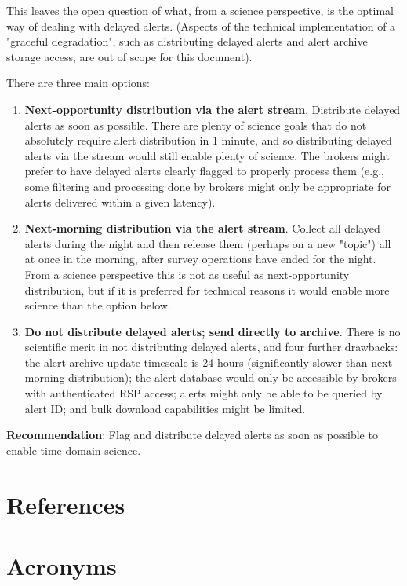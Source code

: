 \documentclass[DM,authoryear,toc]{lsstdoc}
\begin{document}
This leaves the open question of what, from a science perspective, is the optimal way of dealing with delayed alerts.
(Aspects of the technical implementation of a "graceful degradation", such as distributing delayed alerts and alert archive storage access, are out of scope for this document).

There are three main options:

\begin{enumerate}
\item \textbf{Next-opportunity distribution via the alert stream}.
Distribute delayed alerts as soon as possible.
There are plenty of science goals that do not absolutely require alert distribution in 1 minute, and so distributing delayed alerts via the stream would still enable plenty of science.
The brokers might prefer to have delayed alerts clearly flagged to properly process them (e.g., some filtering and processing done by brokers might only be appropriate for alerts delivered within a given latency).
\item \textbf{Next-morning distribution via the alert stream}.
Collect all delayed alerts during the night and then release them (perhaps on a new "topic") all at once in the morning, after survey operations have ended for the night.
From a science perspective this is not as useful as next-opportunity distribution, but if it is preferred for technical reasons it would enable more science than the option below.
\item \textbf{Do not distribute delayed alerts; send directly to archive}.
There is no scientific merit in not distributing delayed alerts, and four further drawbacks: the alert archive update timescale is 24 hours (significantly slower than next-morning distribution); the alert database would only be accessible by brokers with authenticated RSP access; alerts might only be able to be queried by alert ID; and bulk download capabilities might be limited.
\end{enumerate}

\textbf{Recommendation}: Flag and distribute delayed alerts as soon as possible to enable time-domain science.

\appendix
\section{References} \label{sec:bib}
\renewcommand{\refname}{} %


\section{Acronyms} \label{sec:acronyms}

\end{document}
